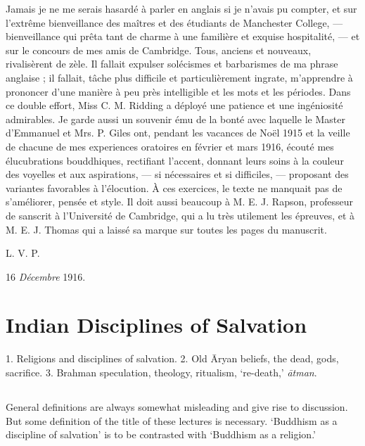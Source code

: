 \documentclass[a4paper, 11pt, oneside, english]{article}
\begin{document}
Jamais je ne me serais hasardé à parler en anglais si je n'avais pu compter, et sur l'extrême bienveillance des maîtres et des étudiants de Manchester College, --- bienveillance qui prêta tant de charme à une familière et exquise hospitalité, --- et sur le concours de mes amis de Cambridge. Tous, anciens et nouveaux, rivalisèrent de zèle. Il fallait expulser solécismes et barbarismes de ma phrase anglaise ; il fallait, tâche plus difficile et particulièrement ingrate, m'apprendre à prononcer d'une manière à peu près intelligible et les mots et les périodes. Dans ce double effort, Miss C. M. Ridding a déployé une patience et une ingéniosité admirables. Je garde aussi un souvenir ému de la bonté avec laquelle le Master d'Emmanuel et Mrs. P. Giles ont, pendant les vacances de Noël 1915 et la veille de chacune de mes experiences oratoires en février et mars 1916, écouté mes élucubrations bouddhiques, rectifiant l'accent, donnant leurs soins à la couleur des voyelles et aux aspirations, --- si nécessaires et si difficiles, --- proposant des variantes favorables à l'élocution. À ces exercices, le texte ne manquait pas de s'améliorer, pensée et style. Il doit aussi beaucoup à M. E. J. Rapson, professeur de sanscrit à l'Université de Cambridge, qui a lu très utilement les épreuves, et à M. E. J. Thomas qui a laissé sa marque sur toutes les pages du manuscrit.

\bigskip

L. V. P.

\bigskip

16 \emph{Décembre} 1916.
\clearpage
\section{Indian Disciplines of Salvation}
\begin{center}\footnotesize
1. Religions and disciplines of salvation. 2. Old Āryan beliefs, the dead, gods, sacrifice. 3. Brahman speculation, theology, ritualism, `re-death,' \emph{ātman}.
\end{center}
\subsection{}
\paragraph{}
General definitions are always somewhat misleading and give rise to discussion. But some definition of the title of these lectures is necessary. `Buddhism as a discipline of salvation' is to be contrasted with `Buddhism as a religion.'
\end{document}
